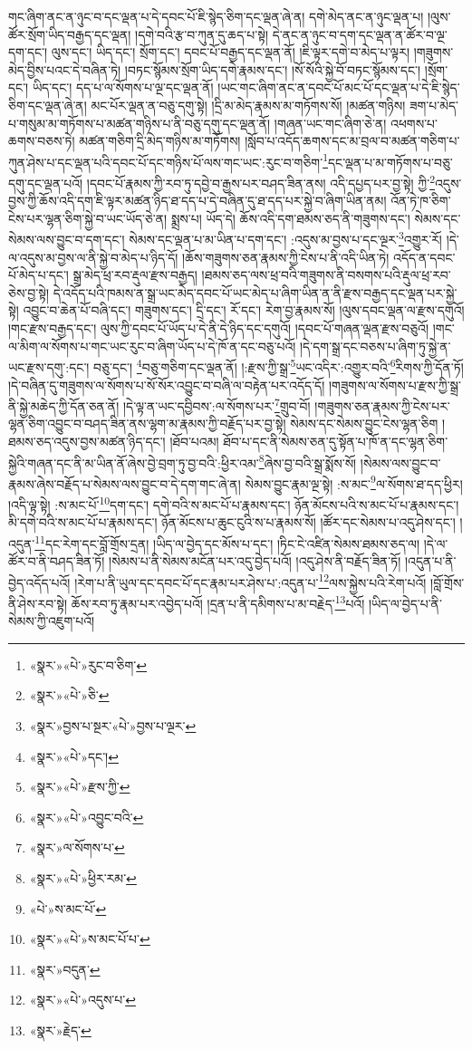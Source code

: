 གང་ཞིག་ནང་ན་ཉུང་བ་དང་ལྡན་པ་དེ་དབང་པོ་ཇི་སྙེད་ཅིག་དང་ལྡན་ཞེ་ན། དགེ་མེད་ནང་ན་ཉུང་ལྡན་པ། །ལུས་ཚོར་སྲོག་ཡིད་བརྒྱད་དང་ལྡན། །དགེ་བའི་རྩ་བ་ཀུན་དུ་ཆད་པ་སྟེ། དེ་ནང་ན་ཉུང་བ་དག་དང་ལྡན་ན་ཚོར་བ་ལྔ་དག་དང་། ལུས་དང་། ཡིད་དང་། སྲོག་དང་། དབང་པོ་བརྒྱད་དང་ལྡན་ནོ། །ཇི་ལྟར་དགེ་བ་མེད་པ་ལྟར། །གཟུགས་མེད་བྱིས་པའང་དེ་བཞིན་ཏེ། །བཏང་སྙོམས་སྲོག་ཡིད་དགེ་རྣམས་དང་། །སོ་སོའི་སྐྱེ་བོ་བཏང་སྙོམས་དང་། །སྲོག་དང་། ཡིད་དང་། དད་པ་ལ་སོགས་པ་ལྔ་དང་ལྡན་ནོ། །ཡང་གང་ཞིག་ནང་ན་དབང་པོ་མང་པོ་དང་ལྡན་པ་དེ་ཇི་སྙེད་ཅིག་དང་ལྡན་ཞེ་ན། མང་པོར་ལྡན་ན་བཅུ་དགུ་སྟེ། །དྲི་མ་མེད་རྣམས་མ་གཏོགས་སོ། །མཚན་གཉིས། ཟག་པ་མེད་པ་གསུམ་མ་གཏོགས་པ་མཚན་གཉིས་པ་ནི་བཅུ་དགུ་དང་ལྡན་ནོ། །གཞན་ཡང་གང་ཞིག་ཅེ་ན། འཕགས་པ་ཆགས་བཅས་ཏེ། མཚན་གཅིག་དྲི་མེད་གཉིས་མ་གཏོགས། །སློབ་པ་འདོད་ཆགས་དང་མ་བྲལ་བ་མཚན་གཅིག་པ་ཀུན་ཤེས་པ་དང་ལྡན་པའི་དབང་པོ་དང་གཉིས་པོ་ལས་གང་ཡང་:རུང་བ་གཅིག་\footnote{«སྣར་»«པེ་»རུང་བ་ཅིག་}དང་ལྡན་པ་མ་གཏོགས་པ་བཅུ་དགུ་དང་ལྡན་པའོ། །དབང་པོ་རྣམས་ཀྱི་རབ་ཏུ་དབྱེ་བ་རྒྱས་པར་བཤད་ཟིན་ནས། འདི་དཔྱད་པར་བྱ་སྟེ། ཀྱི་\footnote{«སྣར་»«པེ་»ཅི་}འདུས་བྱས་ཀྱི་ཆོས་འདི་དག་ཇི་ལྟར་མཚན་ཉིད་ཐ་དད་པ་དེ་བཞིན་དུ་ཐ་དད་པར་སྐྱེ་བ་ཞིག་ཡིན་ནམ། འོན་ཏེ་ཁ་ཅིག་ངེས་པར་ལྷན་ཅིག་སྐྱེ་བ་ཡང་ཡོད་ཅེ་ན། སྨྲས་པ། ཡོད་དེ། ཆོས་འདི་དག་ཐམས་ཅད་ནི་གཟུགས་དང་། སེམས་དང་སེམས་ལས་བྱུང་བ་དག་དང་། སེམས་དང་ལྡན་པ་མ་ཡིན་པ་དག་དང་། :འདུས་མ་བྱས་པ་དང་ལྔར་\footnote{«སྣར་»བྱས་པ་སྔར་«པེ་»བྱས་པ་ལྔར་}འགྱུར་རོ། །དེ་ལ་འདུས་མ་བྱས་ལ་ནི་སྐྱེ་བ་མེད་པ་ཉིད་དོ། །ཆོས་གཟུགས་ཅན་རྣམས་ཀྱི་ངེས་པ་ནི་འདི་ཡིན་ཏེ། འདོད་ན་དབང་པོ་མེད་པ་དང་། སྒྲ་མེད་ཕྲ་རབ་རྡུལ་རྫས་བརྒྱད། །ཐམས་ཅད་ལས་ཕྲ་བའི་གཟུགས་ནི་བསགས་པའི་རྡུལ་ཕྲ་རབ་ཅེས་བྱ་སྟེ། དེ་འདོད་པའི་ཁམས་ན་སྒྲ་ཡང་མེད་དབང་པོ་ཡང་མེད་པ་ཞིག་ཡིན་ན་ནི་རྫས་བརྒྱད་དང་ལྡན་པར་སྐྱེ་སྟེ། འབྱུང་བ་ཆེན་པོ་བཞི་དང་། གཟུགས་དང་། དྲི་དང་། རོ་དང་། རེག་བྱ་རྣམས་སོ། །ལུས་དབང་ལྡན་ལ་རྫས་དགུའོ། །གང་རྫས་བརྒྱད་དང་། ལུས་ཀྱི་དབང་པོ་ཡོད་པ་དེ་ནི་དེ་ཉིད་དང་དགུའོ། །དབང་པོ་གཞན་ལྡན་རྫས་བཅུའོ། །གང་ལ་མིག་ལ་སོགས་པ་གང་ཡང་རུང་བ་ཞིག་ཡོད་པ་དེ་ཁོ་ན་དང་བཅུ་པའོ། །དེ་དག་སྒྲ་དང་བཅས་པ་ཞིག་ཏུ་སྐྱེ་ན་ཡང་རྫས་དགུ་:དང་། བཅུ་དང་། \footnote{«སྣར་»«པེ་»དང་།  }བཅུ་གཅིག་དང་ལྡན་ནོ། །:རྫས་ཀྱི་སྒྲ་\footnote{«སྣར་»«པེ་»རྫས་ཀྱི་}ཡང་འདིར་:འགྱུར་བའི་\footnote{«སྣར་»«པེ་»འབྱུང་བའི་}རིགས་ཀྱི་དོན་ཏོ། །དེ་བཞིན་དུ་གཟུགས་ལ་སོགས་པ་སོ་སོར་འབྱུང་བ་བཞི་ལ་བརྟེན་པར་འདོད་དོ། །གཟུགས་ལ་སོགས་པ་རྫས་ཀྱི་སྒྲ་ནི་སྐྱེ་མཆེད་ཀྱི་དོན་ཅན་ནོ། །དེ་ལྟ་ན་ཡང་དབྱིབས་:ལ་སོགས་པར་\footnote{«སྣར་»ལ་སོགས་པ་}གྲུབ་བོ། །གཟུགས་ཅན་རྣམས་ཀྱི་ངེས་པར་ལྷན་ཅིག་འབྱུང་བ་བཤད་ཟིན་ནས་ལྷག་མ་རྣམས་ཀྱི་བརྗོད་པར་བྱ་སྟེ། སེམས་དང་སེམས་བྱུང་ངེས་ལྷན་ཅིག །ཐམས་ཅད་འདུས་བྱས་མཚན་ཉིད་དང་། །ཐོབ་པའམ། ཐོབ་པ་དང་ནི་སེམས་ཅན་དུ་སྟོན་པ་ཁོ་ན་དང་ལྷན་ཅིག་སྐྱེའི་གཞན་དང་ནི་མ་ཡིན་ནོ་ཞེས་བྱེ་བྲག་ཏུ་བྱ་བའི་:ཕྱིར་འམ་\footnote{«སྣར་»«པེ་»ཕྱིར་རམ་}ཞེས་བྱ་བའི་སྒྲ་སྨོས་སོ། །སེམས་ལས་བྱུང་བ་རྣམས་ཞེས་བརྗོད་པ་སེམས་ལས་བྱུང་བ་དེ་དག་གང་ཞེ་ན། སེམས་བྱུང་རྣམ་ལྔ་སྟེ། :ས་མང་\footnote{«པེ་»ས་མང་པོ་}ལ་སོགས་ཐ་དད་ཕྱིར། །འདི་ལྟ་སྟེ། :ས་མང་པོ་\footnote{«སྣར་»«པེ་»ས་མང་པོ་པ་}དག་དང་། དགེ་བའི་ས་མང་པོ་པ་རྣམས་དང་། ཉོན་མོངས་པའི་ས་མང་པོ་པ་རྣམས་དང་། མི་དགེ་བའི་ས་མང་པོ་པ་རྣམས་དང་། ཉོན་མོངས་པ་ཆུང་ངུའི་ས་པ་རྣམས་སོ། །ཚོར་དང་སེམས་པ་འདུ་ཤེས་དང་། །འདུན་\footnote{«སྣར་»བདུན་}དང་རེག་དང་བློ་གྲོས་དྲན། །ཡིད་ལ་བྱེད་དང་མོས་པ་དང་། །ཏིང་ངེ་འཛིན་སེམས་ཐམས་ཅད་ལ། །དེ་ལ་ཚོར་བ་ནི་བཤད་ཟིན་ཏོ། །སེམས་པ་ནི་སེམས་མངོན་པར་འདུ་བྱེད་པའོ། །འདུ་ཤེས་ནི་བརྗོད་ཟིན་ཏོ། །འདུན་པ་ནི་བྱེད་འདོད་པའོ། །རེག་པ་ནི་ཡུལ་དང་དབང་པོ་དང་རྣམ་པར་ཤེས་པ་:འདུན་པ་\footnote{«སྣར་»«པེ་»འདུས་པ་}ལས་སྐྱེས་པའི་རེག་པའོ། །བློ་གྲོས་ནི་ཤེས་རབ་སྟེ། ཆོས་རབ་ཏུ་རྣམ་པར་འབྱེད་པའོ། །དྲན་པ་ནི་དམིགས་པ་མ་བརྗེད་\footnote{«སྣར་»རྗེད་}པའོ། །ཡིད་ལ་བྱེད་པ་ནི་སེམས་ཀྱི་འཇུག་པའོ། 